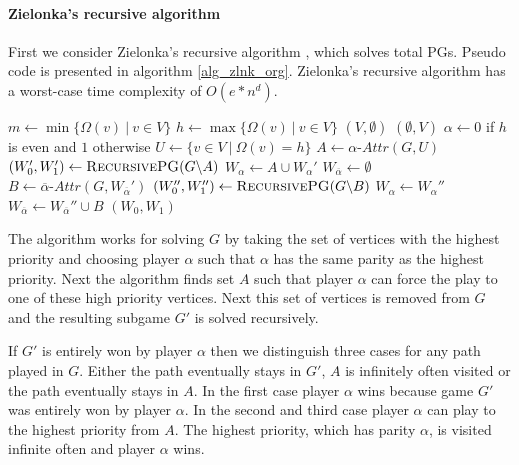 \paragraph{Zielonka's recursive algorithm}
First we consider Zielonka's recursive algorithm \cite{ZIELONKA1998135,MCNAUGHTON1993149}, which solves total PGs. Pseudo code is presented in algorithm \ref{alg_zlnk_org}. Zielonka's recursive algorithm has a worst-case time complexity of $O(e*n^d)$.
\begin{algorithm}
	\caption{$\textsc{RecursivePG}(\textit{PG } G = (V,V_0,V_1, E, \Omega))$}
	\label{alg_zlnk_org}
	\begin{algorithmic}[1]
		\State $m \gets \min\{ \Omega(v)\ |\ v \in V\}$
		\State $h \gets\max\{ \Omega(v)\ |\ v \in V\}$
		\State \Return $(V,\emptyset)$
		\Else
		\State \Return $(\emptyset, V)$
		\EndIf
		\EndIf
		\State $\alpha \gets 0$ if $h$ is even and $1$ otherwise
		\State $U \gets \{v \in V\ |\ \Omega(v) = h\}$
		\State $A \gets \alpha\textit{-Attr}(G, U)$
		\State $(W_0', W_1') \gets \textsc{RecursivePG}(G \backslash A)$
		\State $W_\alpha \gets A \cup W_\alpha'$
		\State $W_{\overline{\alpha}} \gets \emptyset$
		\Else
		\State $B \gets \overline{\alpha}\textit{-Attr}(G,W_{\overline{\alpha}}')$
		\State $(W_0'', W_1'') \gets \textsc{RecursivePG}(G \backslash B)$
		\State $W_\alpha \gets W_\alpha''$
		\State $W_{\overline{\alpha}} \gets W_{\overline{\alpha}}'' \cup B$
		\EndIf
		\State \Return $(W_0, W_1)$
	\end{algorithmic}
\end{algorithm}

The algorithm works for solving $G$ by taking the set of vertices with the highest priority and choosing player $\alpha$ such that $\alpha$ has the same parity as the highest priority. Next the algorithm finds set $A$ such that player $\alpha$ can force the play to one of these high priority vertices. Next this set of vertices is removed from $G$ and the resulting subgame $G'$ is solved recursively. 

If $G'$ is entirely won by player $\alpha$ then we distinguish three cases for any path played in $G$. Either the path eventually stays in $G'$, $A$ is infinitely often visited or the path eventually stays in $A$. In the first case player $\alpha$ wins because game $G'$ was entirely won by player $\alpha$. In the second and third case player $\alpha$ can play to the highest priority from $A$. The highest priority, which has parity $\alpha$, is visited infinite often and player $\alpha$ wins.

